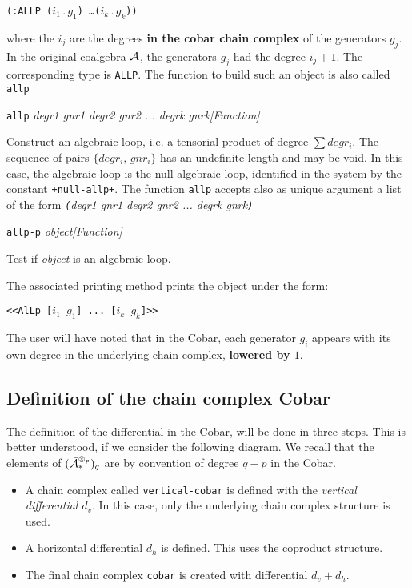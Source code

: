 \begin{center} {\tt (:ALLP  ($i_1\,.\, g_1$) \ldots ($i_k\,.\, g_k$))} \end{center}
where the $i_j$ are the degrees {\bf in the cobar chain complex} of the generators $g_j$.
In the original coalgebra $\cal A$, the generators $g_j$ had the degree $i_j+1$.
The corresponding type is {\tt ALLP}.
The function to build such an object is also called {\tt allp}
\vskip 0.35cm
{\parindent=0mm
{\leftskip=5mm
{\tt allp} {\em  degr1 gnr1 degr2 gnr2 ... degrk gnrk}\hfill {\em [Function]} \par}
{\leftskip=15mm
Construct an algebraic loop, i.e. a  tensorial product of degree $\sum degr_i$. The sequence of pairs
$\lbrace degr_i,\,  gnr_i \rbrace$ has an undefinite length and  may be void. In this case,  the algebraic loop
is the null algebraic loop, identified in the system by the constant {\tt +null-allp+}.
The function {\tt allp} accepts also as unique argument a list of the form
{\em  {\tt (}degr1 gnr1 degr2 gnr2 ... degrk gnrk{\tt )}}    \par}
{\leftskip=5mm
{\tt allp-p} {\em object}\hfill {\em [Function]} \par}
{\leftskip=15mm
Test if {\em object} is an algebraic loop. \par}
}
\vskip 0.35cm
The associated printing  method prints the object under the form:
\begin{center}
{\tt <<AlLp [$i_1$ $g_1$] ... [$i_k$ $g_k$]>>}
\end{center}
The user will have noted that in the Cobar, each generator $g_i$ appears with its own degree in the
underlying chain complex, {\bf lowered by $1$}.

\subsection {Definition of the chain complex Cobar}

The definition of the differential in the Cobar,
will be done in three steps. This is better understood,
if we consider the following diagram. We recall that the elements of $({\bar{\cal A}}_*^{\otimes_p})_q$ are
by convention of degree $q-p$ in the Cobar.
\begin{itemize}
\item A chain complex called {\tt vertical-cobar} is defined with the {\em vertical differential} $d_v$.
In this case, only the  underlying  chain complex structure is used.
\item A horizontal differential $d_h$ is defined. This uses  the co\-pro\-duct structure.
\item The final chain complex {\tt cobar} is created with differential $d_v+d_h$.
\end{itemize}

